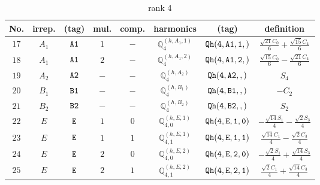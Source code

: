 \documentclass[fleqn,8pt]{jsarticle}
\begin{document}
\begin{table}[ht!]
\begin{center}
\caption{rank 4}
\renewcommand{\arraystretch}{1.3}
\begin{tabular}{cccccccc} \hline \hline
No. & irrep. & (tag) & mul. & comp. & harmonics & (tag) & definition \\ \hline
$ 17 $ & $ A_{1} $ & $ {\tt A1} $ & $ 1 $ & $ - $ & $ \mathbb{Q}_{4}^{(h,A_{1},1)} $ & $ {\tt Qh(4,A1,1,)} $ & $ \frac{\sqrt{21} C_{0}}{6} + \frac{\sqrt{15} C_{4}}{6} $ \\
$ 18 $ & $ A_{1} $ & $ {\tt A1} $ & $ 2 $ & $ - $ & $ \mathbb{Q}_{4}^{(h,A_{1},2)} $ & $ {\tt Qh(4,A1,2,)} $ & $ \frac{\sqrt{15} C_{0}}{6} - \frac{\sqrt{21} C_{4}}{6} $ \\
$ 19 $ & $ A_{2} $ & $ {\tt A2} $ & $ - $ & $ - $ & $ \mathbb{Q}_{4}^{(h,A_{2})} $ & $ {\tt Qh(4,A2,,)} $ & $ S_{4} $ \\
$ 20 $ & $ B_{1} $ & $ {\tt B1} $ & $ - $ & $ - $ & $ \mathbb{Q}_{4}^{(h,B_{1})} $ & $ {\tt Qh(4,B1,,)} $ & $ - C_{2} $ \\
$ 21 $ & $ B_{2} $ & $ {\tt B2} $ & $ - $ & $ - $ & $ \mathbb{Q}_{4}^{(h,B_{2})} $ & $ {\tt Qh(4,B2,,)} $ & $ S_{2} $ \\
$ 22 $ & $ E $ & $ {\tt E} $ & $ 1 $ & $ 0 $ & $ \mathbb{Q}_{4,0}^{(h,E,1)} $ & $ {\tt Qh(4,E,1,0)} $ & $ - \frac{\sqrt{14} S_{1}}{4} - \frac{\sqrt{2} S_{3}}{4} $ \\
$ 23 $ & $ E $ & $ {\tt E} $ & $ 1 $ & $ 1 $ & $ \mathbb{Q}_{4,1}^{(h,E,1)} $ & $ {\tt Qh(4,E,1,1)} $ & $ \frac{\sqrt{14} C_{1}}{4} - \frac{\sqrt{2} C_{3}}{4} $ \\
$ 24 $ & $ E $ & $ {\tt E} $ & $ 2 $ & $ 0 $ & $ \mathbb{Q}_{4,0}^{(h,E,2)} $ & $ {\tt Qh(4,E,2,0)} $ & $ - \frac{\sqrt{2} S_{1}}{4} + \frac{\sqrt{14} S_{3}}{4} $ \\
$ 25 $ & $ E $ & $ {\tt E} $ & $ 2 $ & $ 1 $ & $ \mathbb{Q}_{4,1}^{(h,E,2)} $ & $ {\tt Qh(4,E,2,1)} $ & $ \frac{\sqrt{2} C_{1}}{4} + \frac{\sqrt{14} C_{3}}{4} $ \\
 \hline \hline
\end{tabular}
\end{center}
\end{table}
\end{document}

